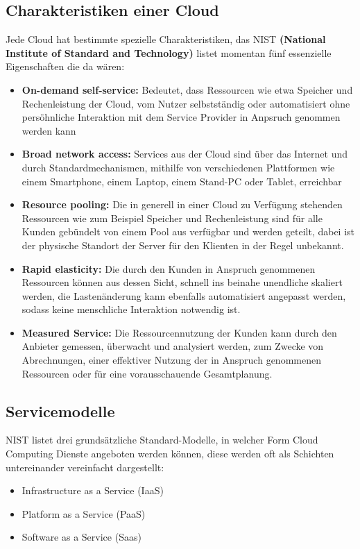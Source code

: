 \subsection{Charakteristiken einer Cloud}
Jede Cloud hat bestimmte spezielle Charakteristiken, das NIST \textbf{(National Institute of Standard and Technology)} listet
momentan fünf essenzielle Eigenschaften die da wären:
\begin{itemize}
	\item \textbf{On-demand self-service: } Bedeutet, dass Ressourcen wie etwa Speicher und Rechenleistung der Cloud, vom Nutzer selbstständig oder automatisiert 
ohne persöhnliche Interaktion mit dem Service Provider in Anpsruch genommen werden kann
	\item \textbf{Broad network access: } Services aus der Cloud sind über das Internet und durch Standardmechanismen, mithilfe von verschiedenen Plattformen wie einem Smartphone, einem Laptop, einem Stand-PC oder Tablet, erreichbar
	\item \textbf{Resource pooling: } Die in generell in einer Cloud zu Verfügung stehenden Ressourcen wie zum Beispiel Speicher und Rechenleistung sind für alle Kunden gebündelt von einem Pool aus verfügbar und werden geteilt, dabei ist der physische Standort der Server für den Klienten in der Regel unbekannt.
	\item \textbf{Rapid elasticity: } Die durch den Kunden in Anspruch genommenen Ressourcen können aus dessen Sicht, schnell ins beinahe unendliche skaliert werden, die Lastenänderung
kann ebenfalls automatisiert angepasst werden, sodass keine menschliche Interaktion notwendig ist.
	\item \textbf{Measured Service: } Die Ressourcennutzung der Kunden kann durch den Anbieter gemessen, überwacht und analysiert werden, zum Zwecke von Abrechnungen, einer effektiver
Nutzung der in Anspruch genommenen Ressourcen oder für eine vorausschauende Gesamtplanung.
\end{itemize}


\subsection{Servicemodelle}
NIST listet drei grundsätzliche Standard-Modelle, in welcher Form Cloud Computing Dienste angeboten werden können, diese werden oft als Schichten untereinander vereinfacht dargestellt:
\begin{itemize}
	\item Infrastructure as a Service (IaaS)
	\item Platform as a Service (PaaS)
	\item Software as a Service (Saas)
\end{itemize}

